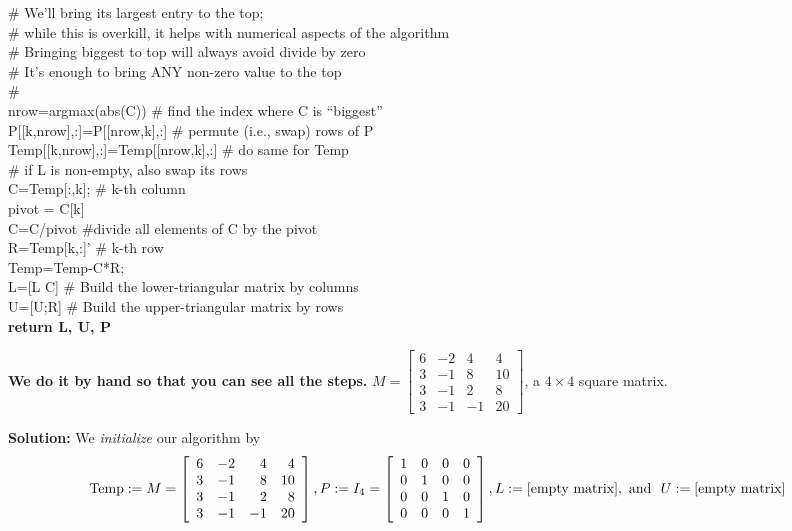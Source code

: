 \begin{tcolorbox}[sharp corners, colback=green!30, colframe=green!80!blue, title=\textbf{\Large LU Factorization of Square Matrices}]
\begin{algorithm}[H]
{{    \# We'll bring its largest entry to the top; \\
    \# while this is overkill, it helps with numerical aspects of the algorithm \\
    \# Bringing biggest to top will always avoid divide by zero \\
    \# It's enough to bring ANY non-zero value to the top \\
    \# \\
   nrow=argmax(abs(C)) \# find the index where C is ``biggest'' \\
   P[[k,nrow],:]=P[[nrow,k],:] \# permute (i.e., swap) rows of P  \\
  {\rm Temp}[[k,nrow],:]={\rm Temp}[[nrow,k],:] \# do same for {\rm Temp}\\
   \# if L is non-empty, also swap its rows \\
    {}
    C=Temp[:,k]; \# k-th column\\
    pivot = C[k]\\
    C=C/pivot \#divide all elements of C by the pivot \\
    R={\rm Temp}[k,:]' \# k-th row\\
     {\rm Temp}={\rm Temp}-C*R; \\
     L=[L C]  \# Build the lower-triangular matrix by columns\\
    U=[U;R] \# Build the upper-triangular matrix by rows \\
  }
}
\textbf{return L, U, P}
\end{algorithm}
\end{tcolorbox}
   
\newpage

 
\begin{example}
\label{ex:SolveUsingLu03} 
\textbf{We do it by hand so that you can see all the steps.} $M=\left[\begin{array}{rrrr} 6 & -2 & 4 & 4\\
3 & -1 & 8 & 10 \\ 3 & -1 & 2 & 8 \\3 & -1 & -1 & 20 \end{array}\right]$, a $4 \times 4$ square matrix. 
\end{example}

\textbf{Solution:} We \textit{initialize} our algorithm by 
$${\rm Temp}:= M =\left[\begin{array}{rrrr} 6 & -2 & 4 & 4\\ 3 & -1 & 8 & 10 \\ 3 & -1 & 2 & 8 \\3 & -1 & -1 & 20 \end{array}\right], P:= I_4 =\left[\begin{array}{rrrr} 1 & 0 & 0 & 0\\ 0 & 1 & 0 & 0 \\ 0 & 0 & 1 & 0 \\0 & 0 & 0 & 1 \end{array}\right], L:=[\textrm{empty matrix}],~\text{and}~~ U:=[\textrm{empty matrix}]$$

